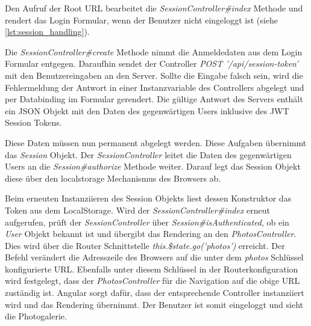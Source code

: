 Den Aufruf der Root URL bearbeitet die \textit{SessionController\#index} Methode und rendert das Login Formular, wenn der Benutzer nicht eingeloggt ist (siehe \ref{lst:session_handling}).

Die \textit{SessionController\#create} Methode nimmt die Anmeldedaten aus dem Login Formular entgegen. Daraufhin sendet der Controller \textit{POST '/api/session-token'} mit den Benutzereingaben an den Server. Sollte die Eingabe falsch sein, wird die Fehlermeldung der Antwort in einer Instanzvariable des Controllers abgelegt und per Databinding im Formular gerendert. Die gültige Antwort des Servers enthält ein JSON Objekt mit den Daten des gegenwärtigen Users inklusive des JWT Session Tokens. 

Diese Daten müssen nun permanent abgelegt werden. Diese Aufgaben übernimmt das \textit{Session} Objekt. Der \textit{SessionController} leitet die Daten des gegenwärtigen Users an die \textit{Session\#authorize} Methode weiter. Darauf legt das Session Objekt diese über den \gls{localstorage} Mechanismus des Browsers ab. 

Beim erneuten Instanziieren des Session Objekts liest dessen Konstruktor das Token aus dem LocalStorage. Wird der \textit{SessionController\#index} erneut aufgerufen, prüft der \textit{SessionController} über \textit{Session\#isAuthenticated}, ob ein \textit{User} Objekt bekannt ist und übergibt das Rendering an den \textit{PhotosController}. Dies wird über die Router Schnittstelle \textit{this.\$state.go('photos')} erreicht. Der Befehl verändert die Adresszeile des Browsers auf die unter dem  \textit{photos} Schlüssel konfigurierte URL. Ebenfalls unter diesem Schlüssel in der Routerkonfiguration
wird festgelegt, dass der \textit{PhotosController} für die Navigation auf die obige URL zuständig ist. Angular sorgt dafür, dass der entsprechende Controller instanziiert wird und das Rendering übernimmt. Der Benutzer ist somit eingeloggt und sieht die Photogalerie.

